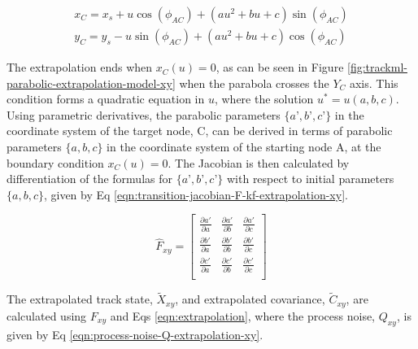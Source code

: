 \begin{equation}
\begin{aligned}
x_C = x_s + u\cos(\phi_{AC}) + (au^2 + bu + c)\sin(\phi_{AC}) \\
y_C = y_s - u\sin(\phi_{AC}) + (au^2 + bu + c)\cos(\phi_{AC})
\end{aligned}
\label{eqn:rotation-parabolic-linear-algebra}
\end{equation}


The extrapolation ends when $x_{C}(u) = 0$, as can be seen in Figure \ref{fig:trackml-parabolic-extrapolation-model-xy} when the parabola crosses the $Y_C$ axis. This condition forms a quadratic equation in $u$, where the solution $u^{*} = u(a, b, c)$. Using parametric derivatives, the parabolic parameters $\{a’, b’, c’ \}$ in the coordinate system of the target node, C, can be derived in terms of parabolic parameters $\{a, b, c \}$ in the coordinate system of the starting node A, at the boundary condition $x_{C}(u) = 0$. The Jacobian is then calculated by differentiation of the formulas for $\{a’, b’, c’ \}$ with respect to initial parameters $\{a, b, c \}$, given by Eq \eqref{eqn:transition-jacobian-F-kf-extrapolation-xy}.  



\begin{equation}
\hat{F}_{xy} = \begin{bmatrix} 
        \frac{\partial a'}{\partial a} & \frac{\partial a'}{\partial b} & \frac{\partial a'}{\partial c} \\ 
        
        \frac{\partial b'}{\partial a} & \frac{\partial b'}{\partial b} & \frac{\partial b'}{\partial c} \\
        
        \frac{\partial c'}{\partial a} & \frac{\partial c'}{\partial b} & \frac{\partial c'}{\partial c} \\
        \end{bmatrix} 
\label{eqn:transition-jacobian-F-kf-extrapolation-xy}
\end{equation}


The extrapolated track state, $\tilde{X}_{xy}$, and extrapolated covariance, $\tilde{C}_{xy}$, are calculated using $F_{xy}$ and Eqs \eqref{eqn:extrapolation}, where the process noise, $Q_{xy}$, is given by Eq \eqref{eqn:process-noise-Q-extrapolation-xy}.

